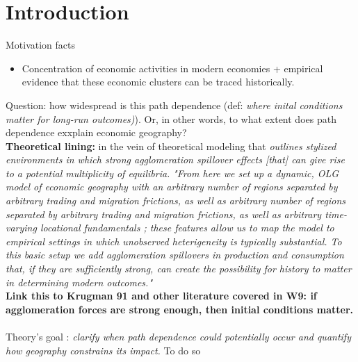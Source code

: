 \documentclass[10pt, final]{article}
\begin{document}
\section{Introduction} %
\label{sec:introduction}

Motivation facts
\begin{itemize}
    \item Concentration of economic activities in modern economies + empirical evidence that these economic clusters can be traced historically.
\end{itemize}
Question: how widespread is this path dependence (def: \textit{where inital conditions matter for long-run outcomes)}). Or, in other words, to what extent does path dependence exxplain economic geography?
\\
\textbf{Theoretical lining:} in the vein of theoretical modeling that \textit{outlines stylized environments in which strong agglomeration spillover effects [that] can give rise to a potential multiplicity of equilibria.} \textit{"From here we set up a dynamic, OLG model of economic geography with an arbitrary number of regions separated by arbitrary trading and migration frictions, as well as arbitrary number of regions separated by arbitrary trading and migration frictions, as well as arbitrary time-varying locational fundamentals ; these features allow us to map the model to empirical settings in which unobserved heterigeneity is typically substantial. To this basic setup we add agglomeration spillovers in production and consumption that, if they are sufficiently strong, can create the possibility for history to matter in determining modern outcomes."}
\\
\textbf{Link this to Krugman 91 and other literature covered in W9: if agglomeration forces are strong enough, then initial conditions matter.}
\\
\\
Theory's goal : \textit{clarify when path dependence could potentially occur and quantify how geography constrains its impact.}
To do so 
\end{document}
